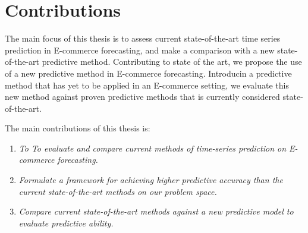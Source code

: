 \section{Contributions}
\label{sections:Introduction:Contributions}



The main focus of this thesis is to assess current state-of-the-art time series prediction in E-commerce forecasting,
and make a comparison with a new state-of-the-art predictive method.
Contributing to state of the art,
we propose the use of a new predictive method in E-commerce forecasting.
Introducin a predictive method that has yet to be applied in an E-commerce setting,
we evaluate this new method against proven predictive methods that is currently considered state-of-the-art.

The main contributions of this thesis is:
\begin{enumerate}
  \item {\it To To evaluate and compare current methods of time-series prediction on E-commerce forecasting.}
  \item {\it Formulate a framework for achieving higher predictive accuracy than the current state-of-the-art methods on our problem space.}
  \item {\it Compare current state-of-the-art methods against a new predictive model to evaluate predictive ability.}
\end{enumerate}




\iffalse
The main focus of this work is to assess the current state of time-series prediction in E-commerce forecasting.
Contributing to the current state of the art,
we propose a method for increasing the predictive ability of time-series forecasting
assessing interest trends of e-commerce product categories.
The main contributions of this paper are:

\begin{enumerate}
  \item {\it To evaluate and compare current methods of time-series prediction on e-commerce.}
  \item {\it To evaluate and compare current state-of-the-art methods for time-series forecasting.}
  \item {\it Formulates a framework for achieving higher predictive accuracy than the current state-of-the-art methods on our problem space.}
\end{enumerate}
\fi


